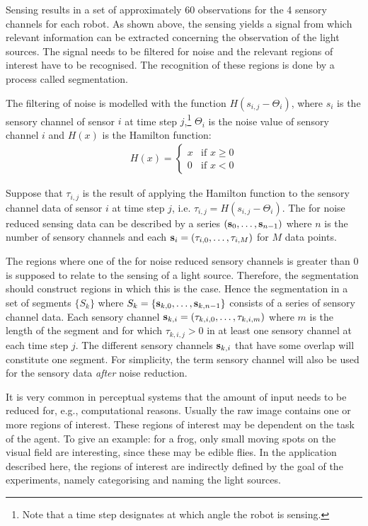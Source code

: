 Sensing results in a set of approximately 60 observations for the 4 sensory channels for each robot. As shown above, the sensing yields a signal from which relevant information can be extracted concerning the observation of the light sources. The signal needs to be filtered for noise and the relevant regions of interest have to be recognised. The recognition of these regions is done by a process called segmentation. 


The filtering of noise is modelled with the function $H(s_{i,j}-\Theta_i)$, where $s_i$ is the sensory channel of sensor $i$ at time step $j$,\footnote{Note that a time step designates at which angle the robot is sensing.} $\Theta_i$ is the noise value of sensory channel $i$ and $H(x)$ is the Hamilton function:
\begin{eqnarray}
H(x)= \left \{ \begin{array}{rl}
	x & \mbox{if }x \geq 0\\
0 & \mbox{if }x < 0 \end{array} \right. \end{eqnarray}


Suppose that $\tau_{i,j}$ is the result of applying the Hamilton function to the sensory channel data of sensor $i$ at time step $j$, i.e. $\tau_{i,j}=H(s_{i,j}-\Theta_i)$. The for noise reduced sensing data can be described by a series $({\bf s}_0,\ldots,{\bf s}_{n-1})$ where $n$ is the number of sensory channels and each ${\bf s}_i=(\tau_{i,0},\ldots,\tau_{i,M})$ for $M$ data points. 

The regions where one of the for noise reduced sensory channels is greater than 0 is supposed to relate to the sensing of a light source. Therefore, the segmentation should construct regions in which this is the case. Hence the segmentation in a set of segments $\{S_k\}$ where $S_k=\{{\bf s}_{k,0},\ldots,{\bf s}_{k,n-1}\}$ consists of a series of sensory channel data. Each sensory channel ${\bf s}_{k,i}=(\tau_{k,i,0},\ldots,\tau_{k,i,m})$ where $m$ is the length of the segment and for which $\tau_{k,i,j}>0$ in at least one sensory channel at each time step $j$. The different sensory channels ${\bf s}_{k,i}$ that have some overlap will constitute one segment. For simplicity, the term sensory channel will also be used for the sensory data {\em after} noise reduction.


It is very common in perceptual systems that the amount of input needs to be reduced for, e.g., computational reasons. Usually the raw image contains one or more regions of interest. These regions of interest may be dependent on the task of the agent. To give an example: for a frog, only small moving spots on the visual field are interesting, since these may be edible flies. In the application described here, the regions of interest are indirectly defined by the goal of the experiments, namely categorising and naming the light sources. 

